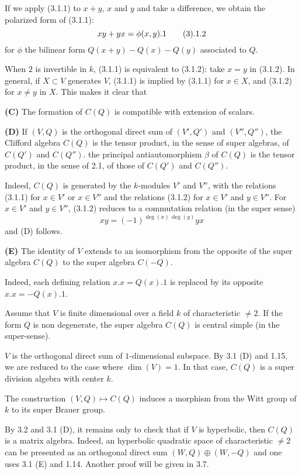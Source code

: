 If we apply (3.1.1) to $x+y$, $x$ and $y$ and take a
difference, we obtain the polarized form of (3.1.1):
$$
xy+yx=\phi(x,y).1
\tag3.1.2
$$
for $\phi$ the bilinear form $Q(x+y)-Q(x)-Q(y)$
associated to $Q$.

When $2$ is invertible in $k$, (3.1.1) is equivalent
to (3.1.2): take $x=y$ in (3.1.2).
In general, if $X\subset V$ generates $V$, (3.1.1)
is implied by (3.1.1) for $x\in X$, and (3.1.2) for
$x\not=y$ in $X$.
This makes it clear that

\smallskip\noindent
{\bf (C)}\enspace
The formation of $C(Q)$ is compatible with extension
of scalars.

\smallskip\noindent
{\bf (D)}\enspace
If $(V,Q)$ is the orthogonal direct sum of $(V',Q')$
and $(V'',Q'')$, the Clifford algebra $C(Q)$ is the
tensor product, in the sense of super algebras, of
$C(Q')$ and $C(Q'')$.
the principal antiautomorphism $\beta$ of $C(Q)$ is
the tensor product, in the sense of 2.1, of those of
$C(Q')$ and $C(Q'')$.

Indeed, $C(Q)$ is generated by the $k$-modules $V'$
and $V''$, with the relations (3.1.1) for $x\in V'$
or $x\in V''$ and the relations (3.1.2) for $x\in
V'$ and $y\in V''$.
For $x\in V'$ and $y\in V''$, (3.1.2) reduces to a
commutation relation (in the super sense)
$$
xy=(-1)^{\deg(x)\,\deg(y)}yx
$$
and (D) follows.

\smallskip\noindent
{\bf (E)}\enspace
The identity of $V$ extends to an isomorphism from
the opposite of the super algebra $C(Q)$ to the
super algebra $C(-Q)$.

\smallskip
Indeed, each defining relation $x.x=Q(x).1$ is
replaced by its opposite $x.x=-Q(x).1$.

Assume that $V$ is finite dimensional over a field
$k$ of characteristic $\not=2$.
If the form $Q$ is non degenerate, the super algebra
$C(Q)$ is central simple (in the super-sense).
\endproclaim

$V$ is the orthogonal direct sum of $1$-dimensional
subspace.
By 3.1 (D) and 1.15, we are reduced to the case
where $\dim(V)=1$.
In that case, $C(Q)$ is a super division algebra
with center $k$.
\enddemo

The construction $(V,Q)\mapsto C(Q)$ induces a
morphism from the Witt group of $k$ to its super
Brauer group.
\endproclaim

By 3.2 and 3.1 (D), it remains only to check that if
$V$ is hyperbolic, then $C(Q)$ is a matrix algebra.
Indeed, an hyperbolic quadratic space of
characteristic $\not=2$ can be presented as an
orthogonal direct sum $(W,Q)\oplus(W,-Q)$ and one
uses 3.1 (E) and 1.14.
Another proof will be given in 3.7.
\enddemo


